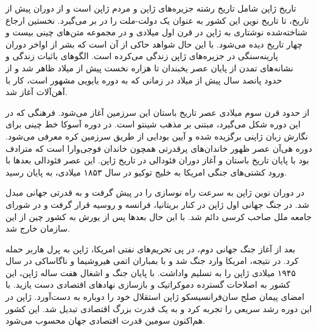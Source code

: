 تاریخ ژاپن شامل تاریخ رشته جزیره‌های ژاپن و مردم ژاپن است و از دوران پیش از تاریخ، تا تاریخ نوین این کشور به عنوان یک دولت-ملت را در بر می‌گیرد. نخستین ارجاع شناخته‌شده نوشتاری به ژاپن در قرن اول میلادی و در مجموعه متن‌های چینی بیست و چهار تاریخ دیده می‌شود. با این حال شواهد حاکی از آن است که بشر از اواخر دوران پارینه‌سنگی در جزیره‌های ژاپن زندگی می‌کرده است. الگوهای باثبات زندگی و نشانه‌های تمدن از پایان عصر یخبندان تا هزاره نخست پیش از میلاد ظاهر شد و از حدود پانصد سال پیش از میلاد در زمانی که به دوره یایویی مشهور است، کار با آهن‌آلات آغاز شد.

از حدود قرن سوم میلادی عصر تاریخ باستان این سرزمین آغاز می‌شود. فرهنگی که در این دوره شکل می‌گیرد، مبتنی بر مذهب شینتو است. در دوره آسوکا خط چینی برای نگارش زبان ژاپنی برگزیده شده و آیین بودایی از طریق سرزمین کره معرفی می‌شود. دوره هی‌آن عصر ظهور خاندان‌های پرقدرتی همچون خاندان فوجی‌وارا است که مترادف بود با پایان تاریخ باستان و آغاز دوران فئودالی در تاریخ ژاپن. این عصر فئودالی بعدها با ورود کشتی‌های جنگی امریکا به خلیج توکیو در سال ۱۸۵۳ میلادی، به پایان رسید.

در دوران نوین ژاپن به سرعت راه نوسازی را در پیش گرفت و به قدرتی جهانی مبدل شد. در جنگ جهانی اول ژاپن در کنار بریتانیا، فرانسه و روسیه قرار گرفت و در شورای جامعه ملل صاحب کرسی دائم شد. با این حال بعدها پس از یورش به کشور چین از این سازمان خارج شد.

بعد از آغاز جنگ جهانی دوم، در پی تحریم‌های نفتی امریکا، ژاپن به پرل هاربر حمله کرد. در نتیجه، امریکا وارد جنگ شد و با بمباران اتمی هیروشیما و ناگاساکی در سال ۱۹۴۵ میلادی ژاپن را به تسلیم واداشت. با پایان جنگ و اشغال هفت ساله ژاپن، این کشور به اصلاحات گسترده دموکراتیک و بازسازی نهادهای اقتصادی دست یازید. با امضای پیمان صلح سان‌فرانسیسکو ژاپن استقلال خود را دوباره به دست‌آورد. ژاپن در این دوره رشد سریعی را تجربه کرد و به یک قدرت بزرگ اقتصادی تبدیل شد. این کشور هم‌اکنون سومین قدرت اقتصادی جهان محسوب می‌شود.
